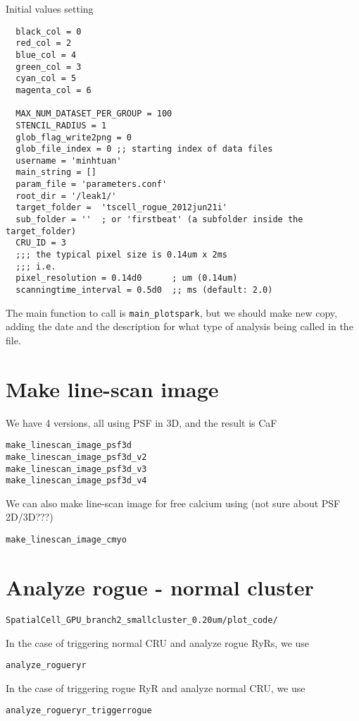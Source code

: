 Initial values setting
\begin{verbatim}
  black_col = 0
  red_col = 2
  blue_col = 4
  green_col = 3
  cyan_col = 5
  magenta_col = 6
  
  MAX_NUM_DATASET_PER_GROUP = 100
  STENCIL_RADIUS = 1
  glob_flag_write2png = 0
  glob_file_index = 0 ;; starting index of data files
  username = 'minhtuan'
  main_string = []
  param_file = 'parameters.conf'
  root_dir = '/leak1/'
  target_folder =  'tscell_rogue_2012jun21i'
  sub_folder = ''  ; or 'firstbeat' (a subfolder inside the target_folder)
  CRU_ID = 3
  ;;; the typical pixel size is 0.14um x 2ms
  ;;; i.e. 
  pixel_resolution = 0.14d0      ; um (0.14um)
  scanningtime_interval = 0.5d0  ;; ms (default: 2.0)
\end{verbatim}

The main function to call is \verb!main_plotspark!, but we should make new copy,
adding the date and the description for what type of analysis being called in
the file.

\section{Make line-scan image}

We have 4 versions, all using PSF in 3D, and the result is CaF
\begin{verbatim}
make_linescan_image_psf3d
make_linescan_image_psf3d_v2
make_linescan_image_psf3d_v3
make_linescan_image_psf3d_v4
\end{verbatim}

We can also make line-scan image for free calcium using (not sure about PSF
2D/3D???)
\begin{verbatim}
make_linescan_image_cmyo
\end{verbatim}

\section{Analyze rogue - normal cluster}

\verb!SpatialCell_GPU_branch2_smallcluster_0.20um/plot_code/!

In the case of triggering normal CRU and analyze rogue RyRs, we use
\begin{verbatim}
analyze_rogueryr
\end{verbatim}

In the case of triggering rogue RyR and analyze normal CRU, we use
\begin{verbatim}
analyze_rogueryr_triggerrogue
\end{verbatim}


